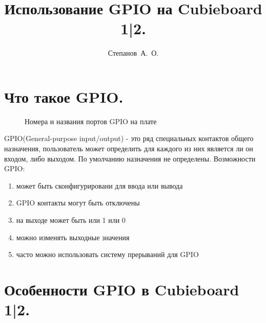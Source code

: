 \documentclass[a4paper,12pt]{report} %
\title{Использование GPIO на Cubieboard 1|2.}
\date{}
\author{Степанов~А.~О.}
\begin{document}
	
	\maketitle
	
	\tableofcontents %
	
	\newpage
	
	\section{Что такое GPIO.}
		\begin{figure}[h]
			\caption{Номера и названия портов GPIO на плате}
			\label{ris:gpio}
		\end{figure}
		GPIO(General-purpose input/output) - это ряд специальных контактов общего
		назначения, пользователь может определить для каждого из них является ли он
		входом, либо выходом.\cite{wiki}
		По умолчанию назначения не определены.
		Возможности GPIO:
		\begin{enumerate}
		  \item{может быть сконфигурировани для ввода или вывода}
		  \item{GPIO контакты могут быть отключены}
		  \item{на выходе может быть или 1 или 0}
		  \item{можно изменять выходные значения}
		  \item{часто можно использовать систему прерываний для GPIO} 
		\end{enumerate}
		
	\section{Особенности GPIO в Cubieboard 1|2.}
	
\end{document}
